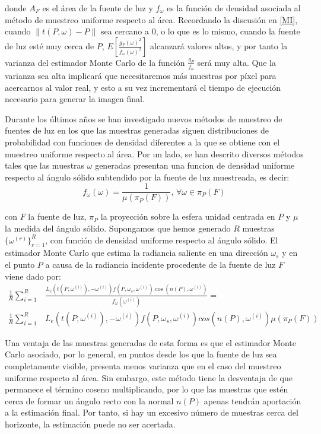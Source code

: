 donde $A_F$ es el área de la fuente de luz y $f_{\omega}$ es la función de densidad asociada al método de muestreo uniforme respecto al área. Recordando la discusión en \ref{MI}, cuando $\|t(P,\omega)-P\|$ sea cercano a $0$, o lo que es lo mismo, cuando la fuente de luz esté muy cerca de $P$, $E[\frac{g_P(\omega)^2}{f_{\omega}(\omega)^2}]$ alcanzará valores altos, y por tanto la varianza del estimador Monte Carlo de la función $\frac{g_P}{f_{\omega}}$ será muy alta. Que la varianza sea alta implicará que necesitaremos más muestras por píxel para acercarnos al valor real, y esto a su vez incrementará el tiempo de ejecución necesario para generar la imagen final.

Durante los últimos años se han investigado nuevos métodos de muestreo de fuentes de luz en los que las muestras generadas siguen distribuciones de probabilidad con funciones de densidad diferentes a la que se obtiene con el muestreo uniforme respecto al área. Por un lado, se han descrito diversos métodos tales que las muestras $\omega$ generadas presentan una funcion de densidad uniforme respecto al ángulo sólido subtendido por la fuente de luz muestreada, es decir:
$$f_{\omega}(\omega) = \frac{1}{\mu(\pi_P(F))}\text{, } \forall \omega\in\pi_P(F)$$

con $F$ la fuente de luz, $\pi_P$ la proyección sobre la esfera unidad centrada en $P$ y $\mu$ la medida del ángulo sólido. Supongamos que hemos generado $R$ muestras $\{\omega^{(r)}\}_{r=1}^R$, con función de densidad uniforme respecto al ángulo sólido. El estimador Monte Carlo que estima la radiancia saliente en una dirección $\omega_s$ y en el punto $P$ a causa de la radiancia incidente procedente de la fuente de luz $F$ viene dado por:
\begin{align*}
\frac{1}{R}\sum_{i=1}^R&\frac{L_e(t(P,\omega^{(i)}),-\omega^{(i)}) f(P,\omega_s,\omega^{(i)}) \cos(n(P),\omega^{(i)}) }{f_{\omega}(\omega^{(i)})} = \\
\frac{1}{R}\sum_{i=1}^R&L_e(t(P,\omega^{(i)}),-\omega^{(i)}) f(P,\omega_s,\omega^{(i)}) cos(n(P),\omega^{(i)}) \mu(\pi_P(F))
\end{align*}

Una ventaja de las muestras generadas de esta forma es que el estimador Monte Carlo asociado, por lo general, en puntos desde los que la fuente de luz sea completamente visible, presenta menos varianza que en el caso del muestreo uniforme respecto al área. Sin embargo, este método tiene la desventaja de que permanece el término coseno multiplicando, por lo que las muestras que estén cerca de formar un ángulo recto con la normal $n(P)$ apenas tendrán aportación a la estimación final. Por tanto, si hay un excesivo número de muestras cerca del horizonte, la estimación puede no ser acertada.

